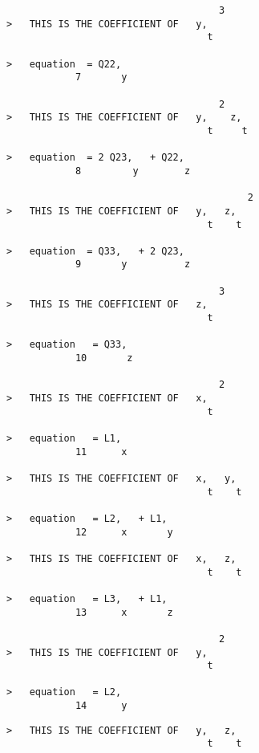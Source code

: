 \begin{verbatim}
                                     3
>   THIS IS THE COEFFICIENT OF   y,
                                   t

>   equation  = Q22,
            7       y

                                     2
>   THIS IS THE COEFFICIENT OF   y,    z,
                                   t     t

>   equation  = 2 Q23,   + Q22,
            8         y        z

                                          2
>   THIS IS THE COEFFICIENT OF   y,   z,
                                   t    t

>   equation  = Q33,   + 2 Q23,
            9       y          z

                                     3
>   THIS IS THE COEFFICIENT OF   z,
                                   t

>   equation   = Q33,
            10       z

                                     2
>   THIS IS THE COEFFICIENT OF   x,
                                   t

>   equation   = L1,
            11      x

>   THIS IS THE COEFFICIENT OF   x,   y,
                                   t    t

>   equation   = L2,   + L1,
            12      x       y

>   THIS IS THE COEFFICIENT OF   x,   z,
                                   t    t

>   equation   = L3,   + L1,
            13      x       z

                                     2
>   THIS IS THE COEFFICIENT OF   y,
                                   t

>   equation   = L2,
            14      y

\end{verbatim}
{\samepage
\begin{verbatim}
>   THIS IS THE COEFFICIENT OF   y,   z,
                                   t    t
\end{verbatim}
}
